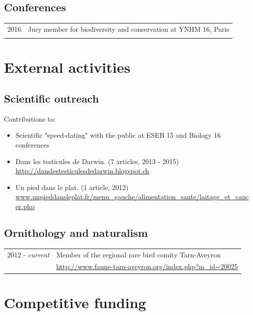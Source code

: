 \subsection{Conferences}
\begin{tabular}{p{4cm}|p{11cm}}
\hfill \textsc{2016} & Jury member for biodiversity and conservation at YNHM 16, Paris\\
\multicolumn{2}{c}{} \\
\end{tabular}

\section{External activities}
\subsection{Scientific outreach}
Contributions to:
\begin{itemize}
	\item Scientific "speed-dating" with the public at ESEB 15 and Biology 16 conferences
\item Dans les testicules de Darwin. (7 articles, 2013 - 2015) \\ \url{http://danslestesticulesdedarwin.blogspot.ch}
\item Un pied dans le plat. (1 article, 2012) \\ \url{www.unpieddansleplat.fr/menu_gauche/alimentation_sante/laitage_et_cancer.php}
\end{itemize}

\subsection{Ornithology and naturalism}
\begin{tabular}{p{4cm}|p{11cm}}
\hfill \textsc{2012 -} \emph{current} & Member of the regional rare bird comity Tarn-Aveyron\\
															& \url{http://www.faune-tarn-aveyron.org/index.php?m_id=20025}\\
\end{tabular}

\section{Competitive funding}
